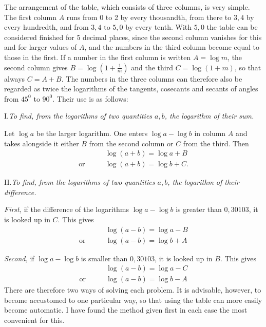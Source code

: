 The arrangement of the table, which consists of three columns, is very simple. The first column \(A\) runs from 0 to 2 by every thousandth, from there to \(3,4\) by every hundredth, and from \(3,4\) to \(5,0\) by every tenth. With \(5,0\) the table can be considered finished for 5 decimal places, since the second column vanishes for this and for larger values of \(A\), and the numbers in the third column become equal to those in the first. If a number in the first column is written \(A=\log m\), the second column gives \(B=\log(1+\frac{1}{m})\) and the third \(C=\log(1+m)\), so that always \(C=A+B\). The numbers in the three columns can therefore also be regarded as twice the logarithms of the tangents, cosecants and secants of angles from \(45^{0}\) to \(90^{0}\). Their use is as follows:

\begin{center}
I.\quad \emph{To find, from the logarithms of two quantities \(a,b\), the logarithm of their sum.}
\end{center}

Let \(\log a\) be the larger logarithm. One enters \(\log a-\log b\) in column \(A\) and takes alongside it either \(B\) from the second column or \(C\) from the third. Then
\[
\begin{aligned}
&\log(a+b)=\log a+B\\
\text{or}\qquad &\log(a+b)=\log b+C.
\end{aligned}
\]

\begin{center}
II.\quad \emph{To find, from the logarithms of two quantities \(a,b\), the logarithm of their difference.}
\end{center}

\emph{First,} if the difference of the logarithms \(\log a-\log b\) is greater than \(0,30103\), it is looked up in \(C\). This gives
\[
\begin{aligned}
&\log(a-b)=\log a-B\\
\text{or}\qquad &\log(a-b)=\log b+A
\end{aligned}
\]

\emph{Second,} if \(\log a-\log b\) is smaller than \(0,30103\), it is looked up in \(B\). This gives
\[
\begin{aligned}
&\log(a-b)=\log a-C\\
\text{or}\qquad &\log(a-b)=\log b-A
\end{aligned}
\]
There are therefore two ways of solving each problem. It is advisable, however, to become accustomed to one particular way, so that using the table can more easily become automatic. I have found the method given first in each case the most convenient for this.

